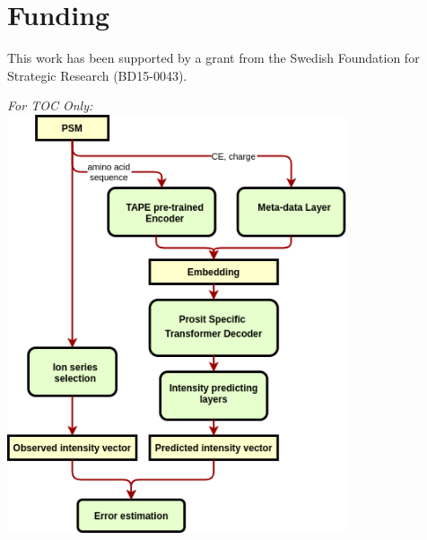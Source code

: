 \documentclass[10pt,a4paper]{article}
\begin{document}
\section*{Funding}

This work has been supported by a grant from the Swedish Foundation for Strategic Research (BD15-0043).





\newpage
{\em For TOC Only:}\\[2em]
\centering
    \includegraphics[width=10cm]{./img/architecture.png}
\end{document}
